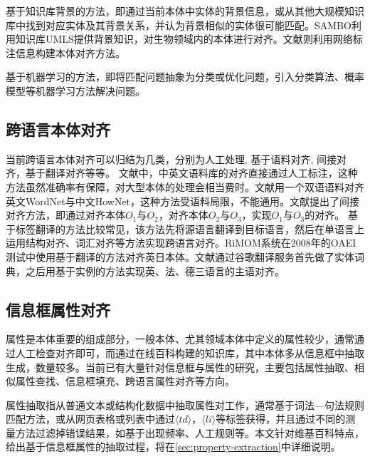 {\heiti 基于知识库背景的方法}，即通过当前本体中实体的背景信息，或从其他大规模知识库中找到对应实体及其背景关系，并认为背景相似的实体很可能匹配。SAMBO\cite{lambrix2006sambo}利用知识库UMLS提供背景知识，对生物领域内的本体进行对齐。文献\cite{wartena2008instanced}则利用网络标注信息构建本体对齐方法。

{\heiti 基于机器学习的方法\cite{niepert2010probabilistic,albagli2012markov}}，即将匹配问题抽象为分类或优化问题，引入分类算法、概率模型等机器学习方法解决问题。

\subsection{跨语言本体对齐}
当前跨语言本体对齐可以归结为几类，分别为人工处理\cite{liang2006mapping}, 基于语料对齐\cite{ngai2002identifying}, 间接对齐\cite{jung2009indirect}，基于翻译对齐\cite{zhang2008rimom,wang2009matching}等等。 文献\cite{liang2006mapping}中，中英文语料库的对齐直接通过人工标注，这种方法虽然准确率有保障，对大型本体的处理会相当费时。文献\cite{ngai2002identifying}用一个双语语料对齐英文WordNet与中文HowNet，这种方法受语料局限，不能通用。文献\cite{jung2009indirect}提出了间接对齐方法，即通过对齐本体$O_1$与$O_2$，对齐本体$O_2$与$O_3$，实现$O_1$与$O_3$的对齐。 
基于标签翻译的方法比较常见，该方法先将源语言翻译到目标语言，然后在单语言上运用结构对齐、词汇对齐等方法实现跨语言对齐。RiMOM系统\cite{zhang2008rimom}在2008年的OAEI测试中使用基于翻译的方法对齐英日本体。文献\cite{wang2009matching}通过谷歌翻译服务首先做了实体词典，之后用基于实例的方法实现英、法、德三语言的主语对齐。

\subsection{信息框属性对齐}
\label{sec:property-research}
属性是本体重要的组成部分，一般本体、尤其领域本体中定义的属性较少，通常通过人工检查对齐即可\cite{wang:movie}，而通过在线百科构建的知识库，其中本体多从信息框中抽取生成，数量较多。当前已有大量针对信息框与属性的研究，主要包括属性抽取、相似属性查找、信息框填充、跨语言属性对齐等方向。

{\heiti 属性抽取}指从普通文本或结构化数据中抽取属性对工作，通常基于词法—句法规则匹配方法\cite{pacsca2007role,lee2013attribute}，或从网页表格或列表中通过$\langle td\rangle$，$\langle li\rangle$等标签获得\cite{crestan2010web}，并且通过不同的测量方法过滤掉错误结果，如基于出现频率\cite{pacsca2007role}、人工规则\cite{lee2013attribute}等。本文针对维基百科特点，给出基于信息框属性的抽取过程，将在\ref{sec:property-extraction}中详细说明。

